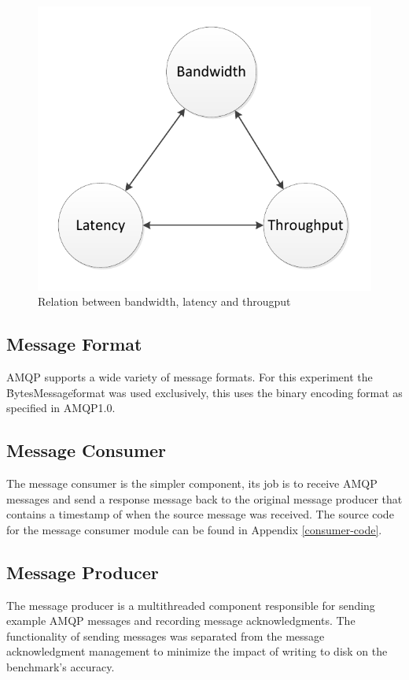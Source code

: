 \documentclass{thesis}
\begin{document}
\begin{figure}[h]
\centering
\includegraphics[scale=.75]{bandwidth_latency_throughput}  
\caption{Relation between bandwidth, latency and througput}
\end{figure}

\subsection{Message Format}
AMQP supports a wide variety of message formats.  For this experiment the \"BytesMessage\" format was used exclusively, this uses the binary encoding format as specified in AMQP1.0.     

\subsection{Message Consumer}
The message consumer is the simpler component, its job is to receive AMQP messages and send a response message back to the original message producer that contains a timestamp of when the source message was received.  The source code for the message consumer module can be found in Appendix \ref{consumer-code}.

\subsection{Message Producer}
The message producer is a multithreaded component responsible for sending example AMQP messages and recording message acknowledgments.  The functionality of sending messages was separated from the message acknowledgment management to minimize the impact of writing to disk on the benchmark's accuracy.  
\end{document}

